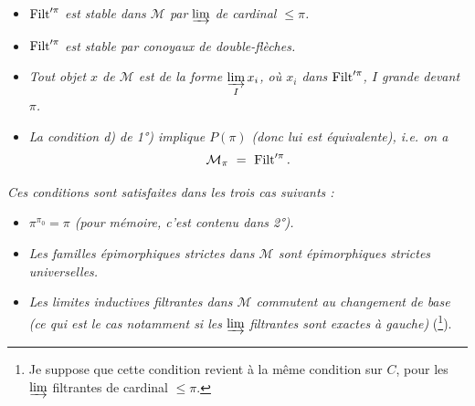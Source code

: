 \dgrchunkbegin

\clearpage

\setcounter{footnote}{49}


\begin{itemize}
\item[\textit{1)}] $\operatorname{Filt}'^{\pi}$ \textit{est stable dans $\mathcal{M}$ par} $\varinjlim$ \textit{de cardinal $\leqslant \pi$.}
\item[\textit{1$'$)}] $\operatorname{Filt}'^{\pi}$ \textit{est stable par conoyaux de double-flèches.}
\item[\textit{2)}] \textit{Tout objet $x$ de $\mathcal{M}$ est de la forme $\varinjlim\limits_{I} x_i$, où $x_i$ dans} $\operatorname{Filt}'^{\pi}$\textit{, $I$ grande devant $\pi$.}
\item[\textit{3)}] \textit{La condition d) de 1°) implique $P(\pi)$ (donc lui est équivalente), i.e. on a}
\[ \mathcal{M}_{\pi} \ = \ \Filt'^{\pi}. \]
\end{itemize}

\textit{Ces conditions sont satisfaites dans les trois cas suivants :}
\begin{itemize}
\item[\textit{A)}] \textit{$\pi^{\pi_0} = \pi$ (pour mémoire, c'est contenu dans 2°).}
\item[\textit{B)}] \textit{Les familles épimorphiques strictes dans $\mathcal{M}$ sont épimorphiques strictes universelles.}
\item[\textit{C)}] \textit{Les limites inductives filtrantes dans $\mathcal{M}$ commutent au changement de base (ce qui est le cas notamment si les} $\varinjlim$ \textit{filtrantes sont exactes à gauche)} (\footnote{Je suppose que cette condition revient à la même condition sur $C$, pour les $\varinjlim$ filtrantes de cardinal $\leqslant \pi$.}).
\end{itemize}

